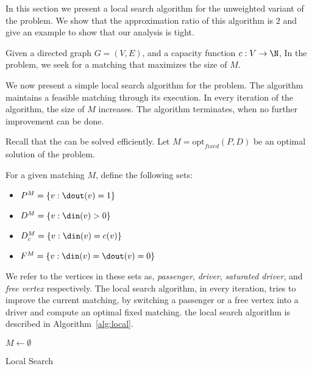\label{sec:uwcm}
In this section we present a local search algorithm for the unweighted
variant of the problem.
We show that the approximation ratio of this algorithm is $2$ and give an example
to show that our analysis is tight.

Given a directed graph $G = (V, E)$, 
and a capacity function ${c : V \rightarrow \N}$, 
In the \textsc{\UWCARPOOL{}} problem, 
we seek for a matching that maximizes the size of $M$.

We now present a simple local search algorithm for the problem. 
The algorithm maintains a feasible matching through its execution.
In every iteration of the algorithm, the size of $M$ increases.
The algorithm terminates, when no further improvement can be done. 

Recall that the \FIXEDCARPOOL{} can be solved efficiently.
Let $M = \text{opt}_{fixed}(P, D)$ be an optimal solution of the
\FIXEDCARPOOL{} problem.
%

For a given matching $M$, define the following sets:
\begin{itemize}
\item $P^M = \{v : \dout(v) = 1\}$
\item $D^M = \{v : \din(v) > 0\}$
\item $D^M_c = \{v : \din(v) = c(v)\}$
\item $F^M = \{v : \din(v) = \dout(v) = 0\}$ 
\end{itemize}
We refer to the vertices in these sets as, \emph{passenger}, 
\emph{driver}, \emph{saturated driver}, and \emph{free vertex} respectively.
The local search algorithm, in every iteration, 
tries to improve the current matching, 
by switching a passenger or a free vertex into a driver 
and compute an optimal fixed matching.
the local search algorithm is described in
Algorithm~\ref{alg:local}.

\begin{algorithm}
$M \leftarrow \emptyset$					\\

\caption{
\label{alg:local}
Local Search}
\end{algorithm}

